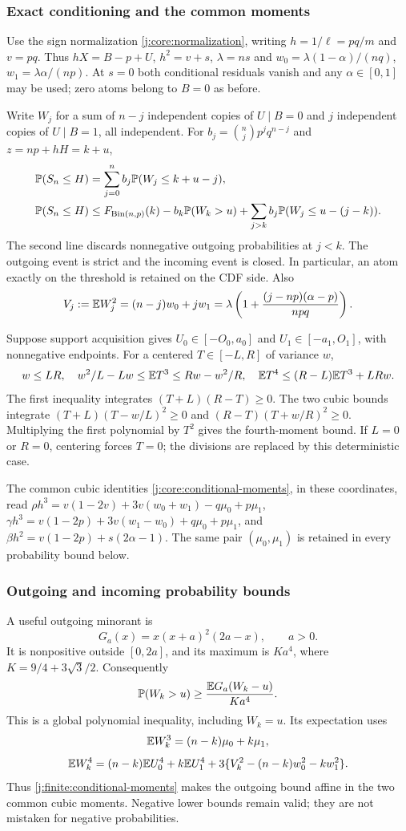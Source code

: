 \subsubsection{Exact conditioning and the common moments}
Use the sign normalization \eqref{j:core:normalization}, writing
$h=1/\ell=pq/m$ and $v=pq$. Thus $hX=B-p+U$,
$h^2=v+s$, $\lambda=ns$ and
$w_0=\lambda(1-\alpha)/(nq)$, $w_1=\lambda\alpha/(np)$.
At $s=0$ both conditional residuals vanish and any $\alpha\in[0,1]$
may be used; zero atoms belong to $B=0$ as before.

Write $W_j$ for a sum of $n-j$ independent copies of $U\mid B=0$
and $j$ independent copies of $U\mid B=1$, all independent. For
$b_j=\binom njp^jq^{n-j}$ and $z=np+hH=k+u$,
\begin{align}
 \mathbb P(S_n\le H)&=\sum_{j=0}^n b_j\mathbb P(W_j\le k+u-j),
 \label{j:finite:count-identity}\\
 \mathbb P(S_n\le H)&\le F_{\mathrm{Bin}(n,p)}(k)
 -b_k\mathbb P(W_k>u)+\sum_{j>k}b_j\mathbb P(W_j\le u-(j-k)).
 \label{j:finite:count-bound}
\end{align}
The second line discards nonnegative outgoing probabilities at $j<k$.
The outgoing event is strict and the incoming event is closed. In particular,
an atom exactly on the threshold is retained on the CDF side.
Also
\[
 V_j:=\mathbb E W_j^2=(n-j)w_0+jw_1
 =\lambda\left(1+\frac{(j-np)(\alpha-p)}{npq}\right).
\]

Suppose support acquisition gives
$U_0\in[-O_0,a_0]$ and $U_1\in[-a_1,O_1]$, with nonnegative
endpoints. For a centered $T\in[-L,R]$ of variance $w$,
\begin{equation}\label{j:finite:conditional-moments}
 w\le LR,\quad w^2/L-Lw\le\mathbb E T^3\le Rw-w^2/R,
 \quad \mathbb E T^4\le(R-L)\mathbb E T^3+LRw.
\end{equation}
The first inequality integrates $(T+L)(R-T)\ge0$. The two cubic
bounds integrate $(T+L)(T-w/L)^2\ge0$ and
$(R-T)(T+w/R)^2\ge0$. Multiplying the first polynomial by $T^2$
gives the fourth-moment bound. If $L=0$ or $R=0$, centering forces
$T=0$; the divisions are replaced by this deterministic case.

The common cubic identities \eqref{j:core:conditional-moments}, in
these coordinates, read $\rho h^3=v(1-2v)+3v(w_0+w_1)-q\mu_0+p\mu_1$,
$\gamma h^3=v(1-2p)+3v(w_1-w_0)+q\mu_0+p\mu_1$, and
$\beta h^2=v(1-2p)+s(2\alpha-1)$. The same pair
$(\mu_0,\mu_1)$ is retained in every probability bound below.

\subsubsection{Outgoing and incoming probability bounds}
A useful outgoing minorant is
\[
 G_a(x)=x(x+a)^2(2a-x),\qquad a>0.
\]
It is nonpositive outside $[0,2a]$, and its maximum is
$K a^4$, where $K=9/4+3\sqrt3/2$. Consequently
\[
 \mathbb P(W_k>u)\ge \frac{\mathbb E G_a(W_k-u)}{K a^4}.
\]
This is a global polynomial inequality, including $W_k=u$.
Its expectation uses
\[
 \mathbb E W_k^3=(n-k)\mu_0+k\mu_1,
\]
\[
 \mathbb E W_k^4=(n-k)\mathbb E U_0^4+k\mathbb E U_1^4
 +3\{V_k^2-(n-k)w_0^2-kw_1^2\}.
\]
Thus \eqref{j:finite:conditional-moments} makes the outgoing bound affine in
the two common cubic moments. Negative lower bounds remain valid; they
are not mistaken for negative probabilities.

